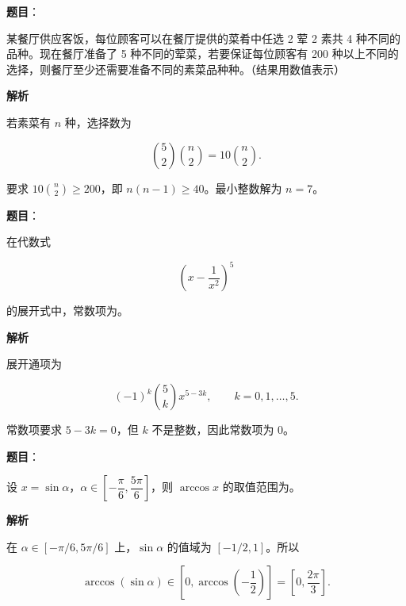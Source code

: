 \begin{answer}

\textbf{题目}：

某餐厅供应客饭，每位顾客可以在餐厅提供的菜肴中任选 2 荤 2 素共 4 种不同的品种。现在餐厅准备了 5 种不同的荤菜，若要保证每位顾客有 200 种以上不同的选择，则餐厅至少还需要准备不同的素菜品种\gkblank{}种。（结果用数值表示）

\textbf{解析}

若素菜有 $n$ 种，选择数为

\nopagebreak[4]
\[
\binom52\binom n2=10\binom n2.
\]

要求 $10\binom n2\ge200$，即 $n(n-1)\ge40$。最小整数解为 $n=7$。


\end{answer}
\begin{answer}

\textbf{题目}：

在代数式

\nopagebreak[4]
\[
\left(x-\frac1{x^2}\right)^5
\]

的展开式中，常数项为\gkblank{}。

\textbf{解析}

展开通项为

\nopagebreak[4]
\[
(-1)^k\binom5k x^{5-3k},\qquad k=0,1,\ldots,5.
\]

常数项要求 $5-3k=0$，但 $k$ 不是整数，因此常数项为 $0$。


\end{answer}
\begin{answer}

\textbf{题目}：

设 $x=\sin\alpha$，$\alpha\in\left[-\dfrac\pi6,\dfrac{5\pi}6\right]$，则 $\arccos x$ 的取值范围为\gkblank{}。

\textbf{解析}

在 $\alpha\in[-\pi/6,5\pi/6]$ 上，$\sin\alpha$ 的值域为 $[-1/2,1]$。所以

\nopagebreak[4]
\[
\arccos(\sin\alpha)\in
\left[0,\arccos\left(-\frac12\right)\right]
=\left[0,\frac{2\pi}{3}\right].
\]


\end{answer}
